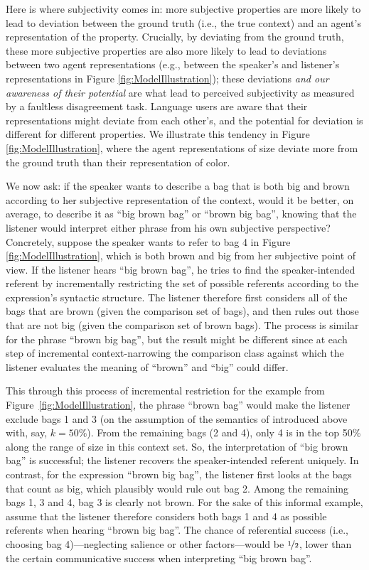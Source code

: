 \documentclass[10pt,a4paper]{article}
\begin{document}
Here is where subjectivity comes in: more subjective properties are more likely to lead to deviation between the ground truth (i.e., the true context) and an agent's representation of the property. Crucially, by deviating from the ground truth, these more subjective properties are also more likely to lead to deviations between two agent representations (e.g., between the speaker's and listener's representations in Figure \ref{fig:ModelIllustration}); these deviations \emph{and our awareness of their potential} are what lead to perceived subjectivity as measured by a faultless disagreement task. Language users are aware that their representations might deviate from each other's, and the potential for deviation is different for different properties. We illustrate this tendency in Figure \ref{fig:ModelIllustration}, where the agent representations of size deviate more from the ground truth than their representation of color.

We now ask: if the speaker wants to describe a bag that is both big and brown according to her subjective representation of the context, would it be better, on average, to describe it as ``big brown bag'' or ``brown big bag'', knowing that the listener would interpret either phrase from his own subjective perspective? Concretely, suppose the speaker wants to refer to bag 4 in Figure \ref{fig:ModelIllustration}, which is both brown and big from her subjective point of view. If the listener hears ``big brown bag'', he tries to find the speaker-intended referent by incrementally restricting the set of possible referents according to the expression's syntactic structure. The listener therefore first considers all of the bags that are brown (given the comparison set of bags), and then rules out those that are not big (given the comparison set of brown bags). The process is similar for the phrase ``brown big bag'', but the result might be different since at each step of incremental context-narrowing the comparison class against which the listener evaluates the meaning of ``brown'' and ``big'' could differ. 

This through this process of incremental restriction for the example from Figure~\ref{fig:ModelIllustration}, the phrase ``brown bag'' would make the listener exclude bags 1 and 3 (on the assumption of the semantics of  introduced above with, say, $k = 50\%$). From the remaining bags (2 and 4), only 4 is in the top 50\% along the range of size in this context set. So, the interpretation of ``big brown bag'' is successful; the listener recovers the speaker-intended referent uniquely. In contrast, for the expression ``brown big bag'', the listener first looks at the bags that count as big, which plausibly would rule out bag 2. Among the remaining bags 1, 3 and 4, bag 3 is clearly not brown. For the sake of this informal example, assume that the listener therefore considers both bags 1 and 4 as possible referents when hearing ``brown big bag''. The chance of referential success (i.e., choosing bag 4)---neglecting salience or other factors---would be $\nicefrac{1}{2}$, lower than the certain communicative success when interpreting ``big brown bag''.
\end{document}
